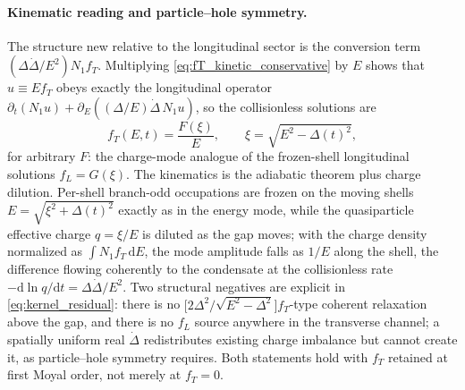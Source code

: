 \documentclass[
  aps,
  prb,
  preprint,
  superscriptaddress,
  longbibliography,
  nofootinbib
]{revtex4-2}
\newcommand{\dd}{\mathrm{d}}
\newcommand{\DOS}{N_1}
\newcommand{\fL}{f_L}
\newcommand{\fT}{f_T}
\begin{document}
\paragraph{Kinematic reading and particle--hole symmetry.}
The structure new relative to the longitudinal sector is the conversion
term \((\Delta\dot\Delta/E^{2})\DOS\fT\). Multiplying
\cref{eq:fT_kinetic_conservative} by \(E\) shows that \(u\equiv E\fT\)
obeys exactly the longitudinal operator
\(\partial_t(\DOS u)+\partial_E((\Delta/E)\dot\Delta\,\DOS u)\), so the
collisionless solutions are
\begin{equation}
  \fT(E,t)=\frac{F(\xi)}{E},
  \qquad
  \xi=\sqrt{E^{2}-\Delta(t)^{2}},
  \label{eq:fT_frozen}
\end{equation}
for arbitrary \(F\): the charge-mode analogue of the frozen-shell
longitudinal solutions \(\fL=G(\xi)\). The kinematics is the adiabatic
theorem plus charge dilution. Per-shell branch-odd occupations are frozen
on the moving shells \(E=\sqrt{\xi^2+\Delta(t)^2}\) exactly as in the
energy mode, while the quasiparticle effective charge \(q=\xi/E\) is
diluted as the gap moves; with the charge density normalized as
\(\int\DOS\fT\,\dd E\), the mode amplitude falls as \(1/E\) along the
shell, the difference flowing coherently to the condensate at the
collisionless rate \(-\dd\ln q/\dd t=\Delta\dot\Delta/E^{2}\). Two
structural negatives are explicit in \cref{eq:kernel_residual}: there is
no \(\bigl[2\Delta^2/\sqrt{E^2-\Delta^2}\bigr]\fT\)-type coherent
relaxation above the gap, and there is no \(\fL\) source anywhere in the
transverse channel; a spatially uniform real \(\dot\Delta\)
redistributes existing charge imbalance but cannot create it, as
particle--hole symmetry requires. Both statements hold with \(\fT\)
retained at first Moyal order, not merely at \(\fT=0\).
\end{document}
